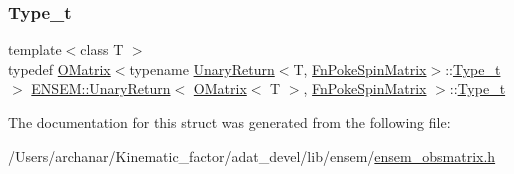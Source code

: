 \subsubsection{\texorpdfstring{Type\_t}{Type\_t}\hspace{0.1cm}{\footnotesize\ttfamily [2/2]}}
{\footnotesize\ttfamily template$<$class T $>$ \\
typedef \mbox{\hyperlink{classENSEM_1_1OMatrix}{O\+Matrix}}$<$typename \mbox{\hyperlink{structENSEM_1_1UnaryReturn}{Unary\+Return}}$<$T, \mbox{\hyperlink{structENSEM_1_1FnPokeSpinMatrix}{Fn\+Poke\+Spin\+Matrix}}$>$\+::\mbox{\hyperlink{structENSEM_1_1UnaryReturn_3_01OMatrix_3_01T_01_4_00_01FnPokeSpinMatrix_01_4_a2018c95323ea7832f6e1e071be4629b8}{Type\+\_\+t}}$>$ \mbox{\hyperlink{structENSEM_1_1UnaryReturn}{E\+N\+S\+E\+M\+::\+Unary\+Return}}$<$ \mbox{\hyperlink{classENSEM_1_1OMatrix}{O\+Matrix}}$<$ T $>$, \mbox{\hyperlink{structENSEM_1_1FnPokeSpinMatrix}{Fn\+Poke\+Spin\+Matrix}} $>$\+::\mbox{\hyperlink{structENSEM_1_1UnaryReturn_3_01OMatrix_3_01T_01_4_00_01FnPokeSpinMatrix_01_4_a2018c95323ea7832f6e1e071be4629b8}{Type\+\_\+t}}}



The documentation for this struct was generated from the following file\+:\begin{DoxyCompactItemize}
\item 
/\+Users/archanar/\+Kinematic\+\_\+factor/adat\+\_\+devel/lib/ensem/\mbox{\hyperlink{lib_2ensem_2ensem__obsmatrix_8h}{ensem\+\_\+obsmatrix.\+h}}\end{DoxyCompactItemize}
